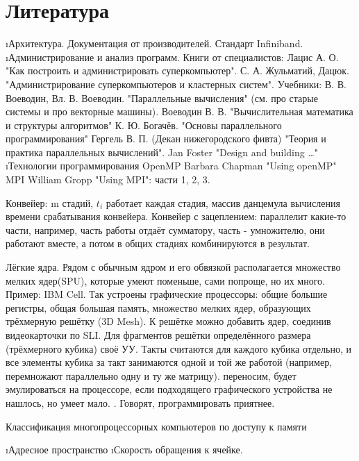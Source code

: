  \section{Литература}
 \begin{enumerate}
  \i Архитектура.
   Документация от производителей.
   Стандарт Infiniband.
  \i Администрирование и анализ программ.
   Книги от специалистов:
    Лацис А. О. "Как построить и администрировать суперкомпьютер".
    С. А. Жульматий, Дацюк. "Администрирование суперкомпьютеров и кластерных систем".
   Учебники:
    В. В. Воеводин, Вл. В. Воеводин. "Параллельные вычисления" (см. про старые системы и про векторные машины).
    Воеводин В. В. "Вычислительная математика и структуры алгоритмов"
    К. Ю. Богачёв. "Основы параллельного программирования"
    Гергель В. П. (Декан нижегородского фивта) "Теория и практика параллельных вычислений".
    Jan Foster "Design and building \dots"
  \i Технологии программирования
    OpenMP Barbara Chapman "Using openMP"
    MPI William Gropp "Using MPI": части 1, 2, 3.
 \end{enumerate}
 
 Конвейер: m стадий, $t_i$ работает каждая стадия, массив данцемула вычисления времени срабатывания конвейера.
 Конвейер с зацеплением: параллелит какие-то части, например, часть работы отдаёт сумматору, часть - умножителю, они работают вместе, а потом в общих стадиях комбинируются в результат.
 
 Лёгкие ядра.
 Рядом с обычным ядром и его обвязкой располагается множество мелких ядер(SPU), которые умеют поменьше, сами попроще, но их много. Пример: IBM Cell.
 Так устроены графические процессоры: общие большие регистры, общая большая память, множество мелких ядер, образующих трёхмерную решётку (3D Mesh). К решётке можно добавить ядер, соединив видеокарточки по SLI.
 Для фрагментов решётки определённого размера (трёхмерного кубика) своё УУ. Такты считаются для каждого кубика отдельно, и все элементы кубика за такт занимаются одной и той же работой (например, перемножают параллельно одну и ту же матрицу).
  переносим, будет эмулироваться на процессоре, если подходящего графического устройства не нашлось, но умеет мало.
 . Говорят, программировать приятнее. 
 
 Классификация многопроцессорных компьютеров по доступу к памяти
 \begin{enumerate}
  \i Адресное пространство
  \i Скорость обращения к ячейке.
 \end{enumerate}
 
